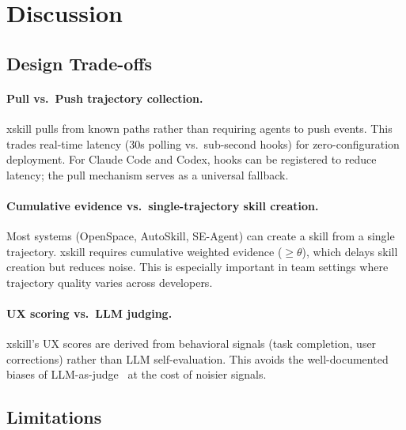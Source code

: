 \documentclass[11pt]{article}
\begin{document}
\section{Discussion}
\label{sec:discussion}

\subsection{Design Trade-offs}

\paragraph{Pull vs.\ Push trajectory collection.} xskill pulls from known paths rather than requiring agents to push events. This trades real-time latency (30s polling vs.\ sub-second hooks) for zero-configuration deployment. For Claude Code and Codex, hooks can be registered to reduce latency; the pull mechanism serves as a universal fallback.

\paragraph{Cumulative evidence vs.\ single-trajectory skill creation.} Most systems (OpenSpace, AutoSkill, SE-Agent) can create a skill from a single trajectory. xskill requires cumulative weighted evidence ($\geq\theta$), which delays skill creation but reduces noise. This is especially important in team settings where trajectory quality varies across developers.

\paragraph{UX scoring vs.\ LLM judging.} xskill's UX scores are derived from behavioral signals (task completion, user corrections) rather than LLM self-evaluation. This avoids the well-documented biases of LLM-as-judge~\citep{zheng2024judging} at the cost of noisier signals.

\subsection{Limitations}
\end{document}
